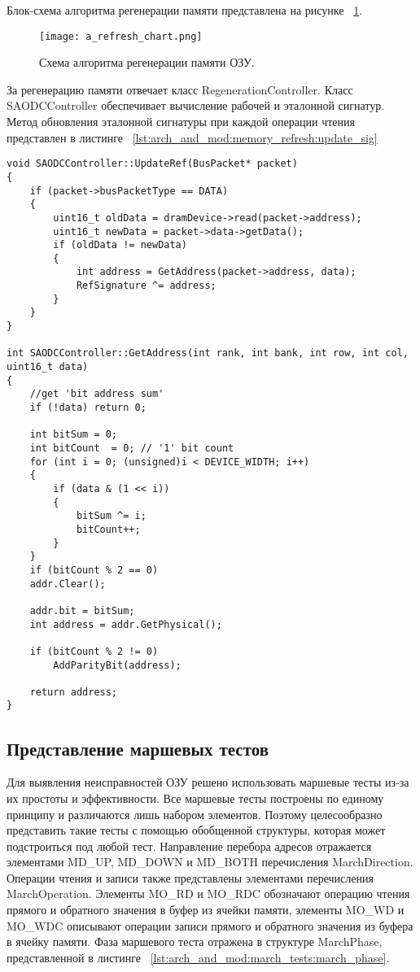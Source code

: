 Блок-схема алгоритма регенерации памяти представлена на рисунке ~\ref{fig:arch_and_mod:memory_refresh:refresh_chart}.

\begin{figure}[ht]
\centering
  \texttt{[image: a\_refresh\_chart.png]}  
  \caption{ Схема алгоритма регенерации памяти ОЗУ.}
  \label{fig:arch_and_mod:memory_refresh:refresh_chart}
\end{figure}

За регенерацию памяти отвечает класс RegenerationController. Класс SAODCController обеспечивает вычисление рабочей и эталонной сигнатур. Метод обновления эталонной сигнатуры при каждой операции чтения представлен в листинге ~\ref{lst:arch_and_mod:memory_refresh:update_sig}

\begin{lstlisting}[style=cplusplusstyle, caption={Обновление эталонной сигнатуры ОЗУ}, label=lst:arch_and_mod:memory_refresh:update_sig]
void SAODCController::UpdateRef(BusPacket* packet)
{
    if (packet->busPacketType == DATA)
    {
        uint16_t oldData = dramDevice->read(packet->address);
        uint16_t newData = packet->data->getData();
        if (oldData != newData)
        {
            int address = GetAddress(packet->address, data);
            RefSignature ^= address;       
        }
    }
}

int SAODCController::GetAddress(int rank, int bank, int row, int col, uint16_t data)
{
    //get 'bit address sum'
    if (!data) return 0;
    
    int bitSum = 0;
    int bitCount  = 0; // '1' bit count
    for (int i = 0; (unsigned)i < DEVICE_WIDTH; i++)
    {
        if (data & (1 << i))
        {
            bitSum ^= i;
            bitCount++;
        }
    }
    if (bitCount % 2 == 0)
    addr.Clear();
    
    addr.bit = bitSum;
    int address = addr.GetPhysical();

    if (bitCount % 2 != 0)
        AddParityBit(address);
  
    return address;
}
\end{lstlisting} 

\subsection{Представление маршевых тестов}
\label{sub:arch_and_mod:march_tests}

Для выявления неисправностей ОЗУ решено использовать маршевые тесты из-за их простоты и эффективности. Все маршевые тесты построены по единому принципу и различаются лишь набором элементов. Поэтому целесообразно представить такие тесты с помощью обобщенной структуры, которая может подстроиться под любой тест. Направление перебора адресов отражается элементами MD\_UP, MD\_DOWN и MD\_BOTH перечисления MarchDirection. Операции чтения и записи также представлены элементами перечисления MarchOperation. Элементы MO\_RD и MO\_RDC обозначают операцию чтения прямого и обратного значения в буфер из ячейки памяти, элементы MO\_WD и MO\_WDC описывают операции записи прямого и обратного значения из буфера в ячейку памяти. Фаза маршевого теста отражена в структуре MarchPhase, представленной в листинге ~\ref{lst:arch_and_mod:march_tests:march_phase}.

